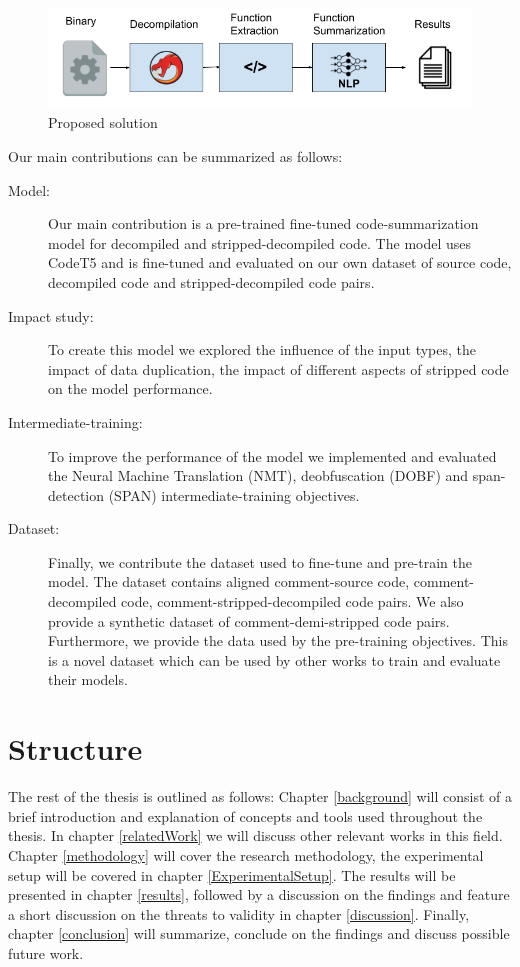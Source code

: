\label{fig:useCase}
\begin{figure}[htb]
    \centering
    \includegraphics[width=\textwidth,height=\textheight,keepaspectratio]{img/UseCase.png}
    \caption{Proposed solution}
\end{figure}

Our main contributions can be summarized as follows:
\begin{description}
 \item[Model:] Our main contribution is a pre-trained fine-tuned code-summarization model for decompiled and stripped-decompiled code. The model uses CodeT5 and is fine-tuned and evaluated on our own dataset of source code, decompiled code and stripped-decompiled code pairs. 
 \item[Impact study:] To create this model we explored the influence of the input types, the impact of data duplication, the impact of different aspects of stripped code on the model performance.
 \item[Intermediate-training:] To improve the performance of the model we implemented and evaluated the Neural Machine Translation (NMT), deobfuscation (DOBF) and span-detection (SPAN) intermediate-training objectives. 
 \item[Dataset:] Finally, we contribute the dataset used to fine-tune and pre-train the model. The dataset contains aligned comment-source code, comment-decompiled code, comment-stripped-decompiled code pairs. We also provide a synthetic dataset of comment-demi-stripped code pairs. Furthermore, we provide the data used by the pre-training objectives. This is a novel dataset which can be used by other works to train and evaluate their models.
\end{description}

\section{Structure}
The rest of the thesis is outlined as follows: Chapter \ref{background} will consist of a brief introduction and explanation of concepts and tools used throughout the thesis. In chapter \ref{relatedWork} we will discuss other relevant works in this field. Chapter \ref{methodology}  will cover the research methodology, the experimental setup will be covered in chapter \ref{ExperimentalSetup}. The results will be presented in chapter \ref{results}, followed by a discussion on the findings and feature a short discussion on the threats to validity in chapter \ref{discussion}. Finally, chapter \ref{conclusion} will summarize, conclude on the findings and discuss possible future work.